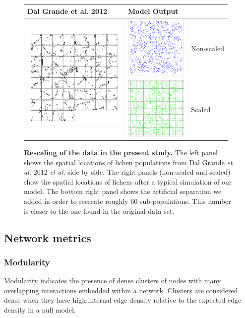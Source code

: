 \documentclass[fleqn,10pt]{wlscirep}
\begin{document}
\begin{figure}[ht!]
\centering
\begin{tabular}{m{5cm}|m{3cm} m{1.7cm}}
 Dal Grande et al. 2012 & \multicolumn{2}{l}{Model Output} \\\hline
 
\multirow{3}{*}{ \includegraphics[height=5cm]{img/subsambpl} } &\includegraphics[width=3cm]{img/nosplit}& Non-scaled \\
  &\includegraphics[width=3cm]{img/split}& Scaled  
\end{tabular}
\caption{\textbf{Rescaling of the data in the present study.} The left panel shows the spatial locations of lichen populations from Dal Grande \textit{et al.} 2012 \emph{et al.} \cite{dal2012vertical} side by side. The right panels (non-scaled and scaled) show the spatial locations of lichens after a typical simulation of our model. The bottom right panel shows the artificial separation we added in order to recreate roughly 60 sub-populations. This number is closer to the one found in the original data set.}
\label{fig:scaling}
\end{figure}

\subsection{Network metrics}
\label{sec:mat:net}
\subsubsection{Modularity}
\label{sec:mat:net:mod}
Modularity indicates the presence of dense clusters of nodes with many overlapping interactions embedded within a network. Clusters are considered dense when they have high internal edge density relative to the expected edge density in a null model. 
\end{document}
